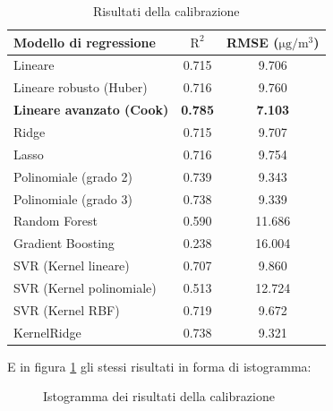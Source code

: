 \begin{table}[H]
    \footnotesize
    \centering
    \begin{tabular}{|l|c|c|}
    \hline
        \textbf{Modello di regressione} & $\bm{\mathrm{R^2}}$ & \textbf{RMSE (}$\mathrm{\si{\micro}g/m^3}$) \\ \hline
        Lineare & 0.715 & 9.706 \\ \hline
        Lineare robusto (Huber) & 0.716 & 9.760 \\ \hline
        \textbf{Lineare avanzato (Cook)} & \textbf{0.785} & \textbf{7.103} \\ \hline
        Ridge & 0.715 & 9.707 \\ \hline
        Lasso & 0.716 & 9.754 \\ \hline
        Polinomiale (grado 2) & 0.739 & 9.343 \\ \hline
        Polinomiale (grado 3) & 0.738 & 9.339 \\ \hline
        Random Forest & 0.590 & 11.686 \\ \hline
        Gradient Boosting & 0.238 & 16.004 \\ \hline
        SVR (Kernel lineare) & 0.707 & 9.860 \\ \hline
        SVR (Kernel polinomiale) & 0.513 & 12.724 \\ \hline
        SVR (Kernel RBF) & 0.719 & 9.672 \\ \hline
        KernelRidge & 0.738 & 9.321 \\ \hline
    \end{tabular}
    \caption{Risultati della calibrazione }
    \label{fig:risultati-pm10}
\end{table}

E in figura \ref{fig:risultati-pm10-hist} gli stessi risultati in forma di istogramma:

\begin{figure}[H]%
    \centering
    \captionsetup{justification=centering}
    \caption{Istogramma dei risultati della calibrazione }%
    \label{fig:risultati-pm10-hist}%
\end{figure}

